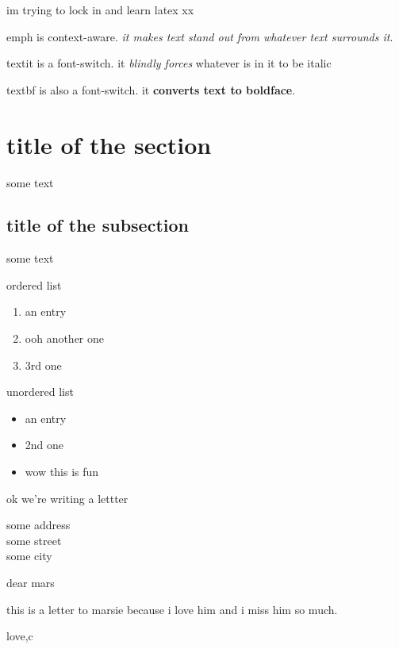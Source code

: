 \documentclass{article}
\begin{document}
im trying to lock in and learn latex xx
\bigskip

emph is context-aware. \emph{it makes text \emph{stand out} from whatever text surrounds it}.

textit is a font-switch. it \textit{blindly forces} whatever is in it to be italic

textbf is also a font-switch. it \textbf{converts text to boldface}.

\section{title of the section}
some text
\subsection{title of the subsection}
some text
\bigskip

ordered list
\begin{enumerate}
\item an entry
\item ooh another one
\item 3rd one
\end{enumerate}

unordered list
\begin{itemize}
\item an entry
\item 2nd one
\item wow this is fun
\end{itemize}

ok we're writing a lettter
\begin{letter}{some address\\some street\\some city}
    \opening{dear mars}
    this is a letter to marsie because i love him and i miss him so much.
    \closing{love,c}
\end{letter}
\end{document}
